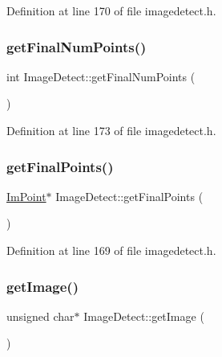 Definition at line 170 of file imagedetect.\+h.

\mbox{\label{class_image_detect_a40764a69b1ea845b170c006150561d5b}} 
\subsubsection{\texorpdfstring{getFinalNumPoints()}{getFinalNumPoints()}}
{\footnotesize\ttfamily int Image\+Detect\+::get\+Final\+Num\+Points (\begin{DoxyParamCaption}{ }\end{DoxyParamCaption})\hspace{0.3cm}{\ttfamily [inline]}}



Definition at line 173 of file imagedetect.\+h.

\mbox{\label{class_image_detect_a8a27f31e31b2a7671194536d8187ba57}} 
\subsubsection{\texorpdfstring{getFinalPoints()}{getFinalPoints()}}
{\footnotesize\ttfamily \mbox{\hyperlink{struct_im_point}{Im\+Point}}$\ast$ Image\+Detect\+::get\+Final\+Points (\begin{DoxyParamCaption}{ }\end{DoxyParamCaption})\hspace{0.3cm}{\ttfamily [inline]}}



Definition at line 169 of file imagedetect.\+h.

\mbox{\label{class_image_detect_aa5bf3a0fbc4dd9b377abf6cfdb86f054}} 
\subsubsection{\texorpdfstring{getImage()}{getImage()}}
{\footnotesize\ttfamily unsigned char$\ast$ Image\+Detect\+::get\+Image (\begin{DoxyParamCaption}{ }\end{DoxyParamCaption})\hspace{0.3cm}{\ttfamily [inline]}}



